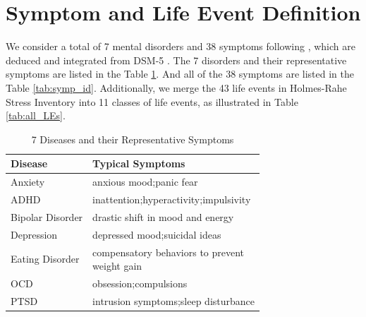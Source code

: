 \section{Symptom and Life Event Definition}
\label{sec:appendixA}

We consider a total of 7 mental disorders and 38 symptoms following \citet{Zhang2022SymptomIF}, which are deduced and integrated from DSM-5 \cite{american2013diagnostic}. The 7 disorders and their representative symptoms are listed in the Table \ref{tab:diseases}. And all of the 38 symptoms are listed in the Table \ref{tab:symp_id}. Additionally, we merge the 43 life events in Holmes-Rahe Stress Inventory \cite{Noone2017stress} into 11 classes of life events, as illustrated in Table \ref{tab:all_LEs}. 

\begin{table}[th]
    \small
    \centering
    \begin{tabular}{l|l}
    \hline
    Disease & Typical Symptoms  \\ 
    \hline
    Anxiety  & anxious mood;panic fear \\ \hline
    ADHD  & inattention;hyperactivity;impulsivity	 \\ \hline
    Bipolar Disorder  & drastic shift in mood and energy	  \\ \hline
    Depression & depressed mood;suicidal ideas	   \\ \hline
    Eating Disorder & \makecell[l]{compensatory behaviors to prevent\\ weight gain}	  \\ \hline
    OCD & obsession;compulsions \\ \hline
    PTSD & intrusion symptoms;sleep disturbance \\
    \hline
    \end{tabular}
    \caption{7 Diseases and their Representative Symptoms}
    \label{tab:diseases}
\end{table}

